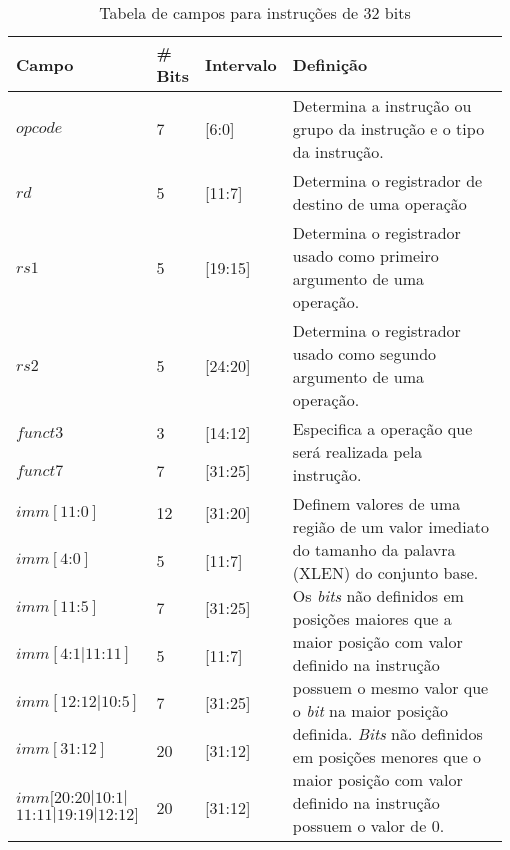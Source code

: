   
  \begin{table}
  \begin{tabular}{ |p{0.2\linewidth}|p{0.08\linewidth}|p{0.12\linewidth}|p{0.58\linewidth}| } 
    \hline
    Campo & {\#} Bits & Intervalo & Definição \\ \hline \hline
    $opcode$ & 7 & [6:0] & Determina a instrução ou grupo da instrução e o tipo da instrução. \\ \hline
    $rd$ & 5 & [11:7] & Determina o registrador de destino de uma operação \\ \hline
    $rs1$ & 5 & [19:15] & Determina o registrador usado como primeiro argumento de uma operação. \\ \hline
    $rs2$ & 5 & [24:20] & Determina o registrador usado como segundo argumento de uma operação. \\ \hline
    $funct3$ & 3 & [14:12] & \multirow{2}{1\linewidth}{Especifica a operação que será realizada pela instrução.}\\
    $funct7$ & 7 & [31:25] & \\ \hline
    $imm[11\text{:}0]$ & 12 & [31:20] & 
    \multirow{7}{1.0\linewidth}{Definem valores de uma região de um valor imediato do tamanho da palavra 
    (XLEN) do conjunto base. Os \emph{bits} não definidos em posições maiores que a maior posição com 
    valor definido na instrução possuem o mesmo valor que o \emph{bit} na maior posição definida. 
    \emph{Bits} não definidos em posições menores que o maior posição com valor definido na instrução 
    possuem o valor de 0.} \\
    $imm[4\text{:}0]$ & 5 & [11:7] & \\
    $imm[11\text{:}5]$ & 7 & [31:25] & \\
    $imm[4\text{:}1|11\text{:}11]$ & 5 & [11:7] & \\
    $imm[12\text{:}12|10\text{:}5]$ & 7 & [31:25] & \\
    $imm[31\text{:}12]$ & 20 & [31:12] & \\
    $imm[20\text{:}20|10\text{:}1|$ $11\text{:}11|19\text{:}19|12\text{:}12]$ & 20 & [31:12] & \\
    \hline 
  
  \end{tabular}
  \caption{Tabela de campos para instruções de 32 bits\label{tab:if32}}
  \end{table}

